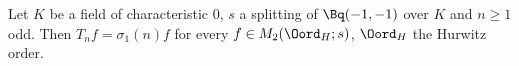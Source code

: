 Let $K$ be a field of characteristic $0$, $s$ a splitting of $\Bq(-1,-1)$ over $K$ and $n\ge1$ odd. Then $T_nf=\sigma_1(n)f$ for every
$f\in M_2(\Oord_H;s)$, $\Oord_H$ the Hurwitz order.
